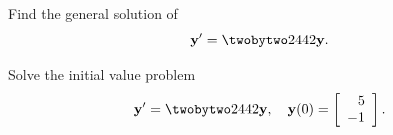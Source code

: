 \setcounter{example}{0}
\setcounter{equation}{7}
\begin{example}
  \label{example:10.4.1}\rm \mbox{}
  \newline
  \begin{alist}
    \item %
    Find the general solution of
    \begin{equation}
      \label{eq:10.4.8}{\bf y}'=\twobytwo2442{\bf y}.
    \end{equation}

    \item %
    Solve the initial value problem
    \begin{equation}
      \label{eq:10.4.9}{\bf y}'=\twobytwo2442{\bf y},\quad{\bf y}(0)=\left[
      \begin{array}{r}
        5  \\
        -1
      \end{array}\right].
    \end{equation}
  \end{alist}
\end{example}
\setcounter{equation}{9}
